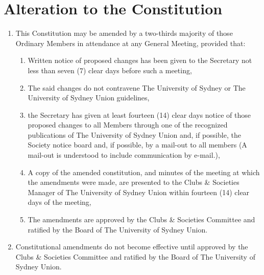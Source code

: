 \documentclass[11pt]{article}
\begin{document}
\section{Alteration to the Constitution}
\begin{enumerate}[\thesection .1]
    \item This Constitution may be amended by a two-thirds majority of those Ordinary Members in attendance at any General Meeting, provided that:
    \begin{enumerate}[\hspace{5mm}1.]
        \item Written notice of proposed changes has been given to the Secretary not less than seven (7) clear days before such a meeting, 
        \item The said changes do not contravene The University of Sydney or The University of Sydney Union guidelines, 
        \item the Secretary has given at least fourteen (14) clear days notice of those proposed changes to all Members through one of the recognized publications of The University of Sydney Union and, if possible, the Society notice board and, if possible, by a mail-out to all members (A mail-out is understood to include communication by e-mail.),
        \item A copy of the amended constitution, and minutes of the meeting at which the amendments were made, are presented to the Clubs \& Societies Manager of The University of Sydney Union within fourteen (14) clear days of the meeting,
        \item The amendments are approved by the Clubs \& Societies Committee and ratified by the Board of The University of Sydney Union.
    \end{enumerate}
    \item Constitutional amendments do not become effective until approved by the Clubs \& Societies Committee and ratified by the Board of The University of Sydney Union.
\end{enumerate}
\end{document}
